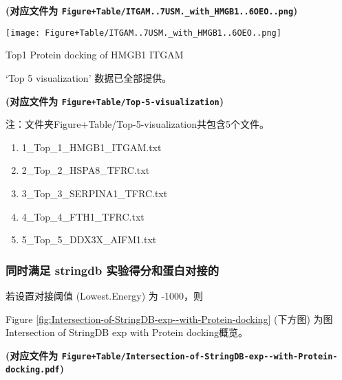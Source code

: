 \documentclass[
]{article}
\providecommand{\tightlist}{%
  \setlength{\itemsep}{0pt}\setlength{\parskip}{0pt}}
\begin{document}
\textbf{(对应文件为 \texttt{Figure+Table/ITGAM..7USM.\_with\_HMGB1..6OEO..png})}

\def\@captype{figure}
\begin{center}
\texttt{[image: Figure+Table/ITGAM..7USM.\_with\_HMGB1..6OEO..png]}
\caption{Top1 Protein docking of HMGB1 ITGAM}\label{fig:Top1-Protein-docking-of-HMGB1-ITGAM}
\end{center}

`Top 5 visualization' 数据已全部提供。

\textbf{(对应文件为 \texttt{Figure+Table/Top-5-visualization})}

\begin{center}\begin{tcolorbox}[colback=gray!10, colframe=gray!50, width=0.9\linewidth, arc=1mm, boxrule=0.5pt]注：文件夹Figure+Table/Top-5-visualization共包含5个文件。

\begin{enumerate}\tightlist
\item 1\_Top\_1\_HMGB1\_ITGAM.txt
\item 2\_Top\_2\_HSPA8\_TFRC.txt
\item 3\_Top\_3\_SERPINA1\_TFRC.txt
\item 4\_Top\_4\_FTH1\_TFRC.txt
\item 5\_Top\_5\_DDX3X\_AIFM1.txt
\end{enumerate}\end{tcolorbox}
\end{center}

\hypertarget{ux540cux65f6ux6ee1ux8db3-stringdb-ux5b9eux9a8cux5f97ux5206ux548cux86cbux767dux5bf9ux63a5ux7684}{%
\subsubsection{同时满足 stringdb 实验得分和蛋白对接的}\label{ux540cux65f6ux6ee1ux8db3-stringdb-ux5b9eux9a8cux5f97ux5206ux548cux86cbux767dux5bf9ux63a5ux7684}}

若设置对接阈值 (Lowest.Energy) 为 -1000，则

Figure \ref{fig:Intersection-of-StringDB-exp--with-Protein-docking} (下方图) 为图Intersection of StringDB exp with Protein docking概览。

\textbf{(对应文件为 \texttt{Figure+Table/Intersection-of-StringDB-exp-\/-with-Protein-docking.pdf})}
\end{document}
